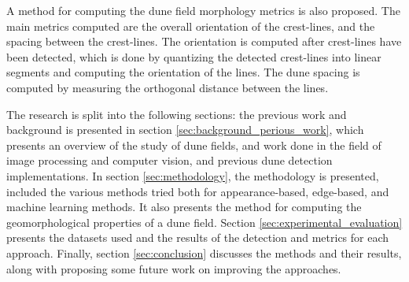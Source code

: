 A method for computing the dune field morphology metrics is also proposed. The main metrics computed are the overall orientation of the crest-lines, and the spacing between the crest-lines. The orientation is computed after crest-lines have been detected, which is done by quantizing the detected crest-lines into linear segments and computing the orientation of the lines. The dune spacing is computed by measuring the orthogonal distance between the lines.

The research is split into the following sections: the previous work and background is presented in section \ref{sec:background_perious_work}, which presents an overview of the study of dune fields, and work done in the field of image processing and computer vision, and previous dune detection implementations. In section \ref{sec:methodology}, the methodology is presented, included the various methods tried both for appearance-based, edge-based, and machine learning methods. It also presents the method for computing the geomorphological properties of a dune field. Section \ref{sec:experimental_evaluation} presents the  datasets used and the results of the detection and metrics for each approach. Finally, section \ref{sec:conclusion} discusses the methods and their results, along with proposing some future work on improving the approaches. 